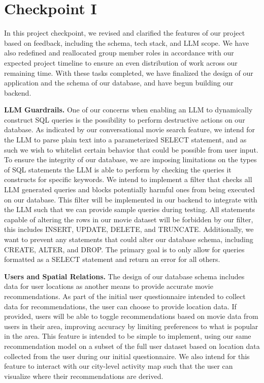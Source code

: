 \documentclass[conference]{IEEEtran}
\begin{document}
\section{Checkpoint I}

In this project checkpoint, we revised and clarified the features of our project based on feedback, including the schema, tech stack, and LLM scope. We have also redefined and reallocated group member roles in accordance with our expected project timeline to ensure an even distribution of work across our remaining time. With these tasks completed, we have finalized the design of our application and the schema of our database, and have begun building our backend.

\textbf{LLM Guardrails.} One of our concerns when enabling an LLM to dynamically construct SQL queries is the possibility to perform destructive actions on our database. As indicated by our conversational movie search feature, we intend for the LLM to parse plain text into a parameterized SELECT statement, and as such we wish to whitelist certain behavior that could be possible from user input. To ensure the integrity of our database, we are imposing limitations on the types of SQL statements the LLM is able to perform by checking the queries it constructs for specific keywords. We intend to implement a filter that checks all LLM generated queries and blocks potentially harmful ones from being executed on our database. This filter will be implemented in our backend to integrate with the LLM such that we can provide sample queries during testing. All statements capable of altering the rows in our movie dataset will be forbidden by our filter, this includes INSERT, UPDATE, DELETE, and TRUNCATE. Additionally, we want to prevent any statements that could alter our database schema, including CREATE, ALTER, and DROP. The primary goal is to only allow for queries formatted as a SELECT statement and return an error for all others.

\textbf{Users and Spatial Relations.} The design of our database schema includes data for user locations as another means to provide accurate movie recommendations. As part of the initial user questionnaire intended to collect data for recommendations, the user can choose to provide location data. If provided, users will be able to toggle recommendations based on movie data from users in their area, improving accuracy by limiting preferences to what is popular in the area. This feature is intended to be simple to implement, using our same recommendation model on a subset of the full user dataset based on location data collected from the user during our initial questionnaire. We also intend for this feature to interact with our city-level activity map such that the user can visualize where their recommendations are derived.
\end{document}
